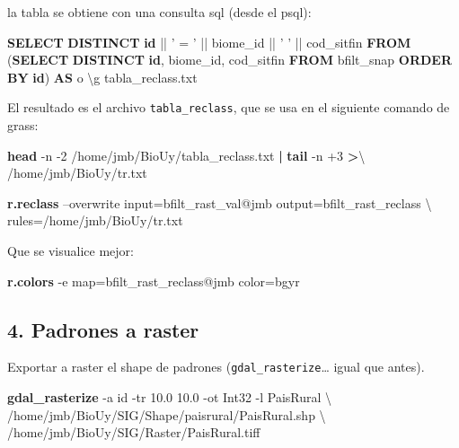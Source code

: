 \documentclass[spanish,]{article}
\newenvironment{Shaded}{}{}
\newcommand{\KeywordTok}[1]{\textcolor[rgb]{0.00,0.44,0.13}{\textbf{{#1}}}}
\newcommand{\StringTok}[1]{\textcolor[rgb]{0.25,0.44,0.63}{{#1}}}
\newcommand{\NormalTok}[1]{{#1}}
\begin{document}
la tabla se obtiene con una consulta sql (desde el psql):

\begin{Shaded}
\begin{Highlighting}[]
\KeywordTok{SELECT} \KeywordTok{DISTINCT} \KeywordTok{id} \NormalTok{|| }\StringTok{' = '} \NormalTok{|| biome_id || }\StringTok{' '} \NormalTok{|| cod_sitfin }
  \KeywordTok{FROM} \NormalTok{(}\KeywordTok{SELECT} \KeywordTok{DISTINCT} \KeywordTok{id}\NormalTok{, biome_id, cod_sitfin }
          \KeywordTok{FROM} \NormalTok{bfilt_snap }
         \KeywordTok{ORDER} \KeywordTok{BY} \KeywordTok{id}\NormalTok{) }\KeywordTok{AS} \NormalTok{o \textbackslash{}g tabla_reclass.txt}
\end{Highlighting}
\end{Shaded}

El resultado es el archivo \texttt{tabla\_reclass}, que se usa en el
siguiente comando de grass:

\begin{Shaded}
\begin{Highlighting}[]
\KeywordTok{head} \NormalTok{-n -2 /home/jmb/BioUy/tabla_reclass.txt }\KeywordTok{|} \KeywordTok{tail} \NormalTok{-n +3 }\KeywordTok{>}\NormalTok{\textbackslash{}}
  \NormalTok{/home/jmb/BioUy/tr.txt}

\KeywordTok{r.reclass} \NormalTok{--overwrite input=bfilt_rast_val@jmb output=bfilt_rast_reclass \textbackslash{}}
  \NormalTok{rules=/home/jmb/BioUy/tr.txt}
\end{Highlighting}
\end{Shaded}

Que se visualice mejor:

\begin{Shaded}
\begin{Highlighting}[]
\KeywordTok{r.colors} \NormalTok{-e map=bfilt_rast_reclass@jmb color=bgyr}
\end{Highlighting}
\end{Shaded}

\subsection{4. Padrones a raster}\label{padrones-a-raster}

Exportar a raster el shape de padrones (\texttt{gdal\_rasterize}\ldots{}
igual que antes).

\begin{Shaded}
\begin{Highlighting}[]
\KeywordTok{gdal_rasterize} \NormalTok{-a id -tr 10.0 10.0 -ot Int32 -l PaisRural \textbackslash{}}
  \NormalTok{/home/jmb/BioUy/SIG/Shape/paisrural/PaisRural.shp \textbackslash{}}
  \NormalTok{/home/jmb/BioUy/SIG/Raster/PaisRural.tiff}
\end{Highlighting}
\end{Shaded}
\end{document}
